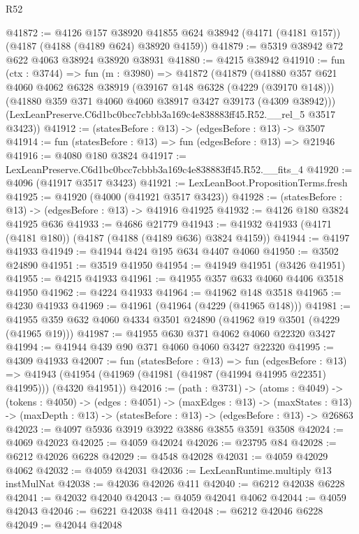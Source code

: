 \begin{lexlean}{R52}
\begin{coremodule}
@41872 := @4126
    @157
    @38920
    @41855
    @624
    @38942
    (@4171 (@4181 @157))
    (@4187 (@4188 (@4189 @624) @38920 @4159))
@41879 := @5319 @38942 @72 @622 @4063 @38924 @38920 @38931
@41880 := @4215 @38942
@41910 := fun (ctx : @3744) =>
  fun (m : @3980) =>
  @41872
    (@41879
      (@41880
        @357
        @621
        @4060
        @4062
        @6328
        @38919
        (@39167 @148 @6328 (@4229 (@39170 @148)))
        (@41880 @359 @371 @4060 @4060 @38917 @3427 @39173 (@4309 @38942)))
      (LexLeanPreserve.C6d1bc0bcc7cbbb3a169c4e838883ff45.R52.__rel_5 @3517 @3423))
@41912 := (statesBefore : @13) -> (edgesBefore : @13) -> @3507
@41914 := fun (statesBefore : @13) => fun (edgesBefore : @13) => @21946
@41916 := @4080 @180 @3824
@41917 := LexLeanPreserve.C6d1bc0bcc7cbbb3a169c4e838883ff45.R52.__fits_4
@41920 := @4096 (@41917 @3517 @3423)
@41921 := LexLeanBoot.PropositionTerms.fresh
@41925 := @41920 (@4000 (@41921 @3517 @3423))
@41928 := (statesBefore : @13) -> (edgesBefore : @13) -> @41916 @41925
@41932 := @4126 @180 @3824 @41925 @636
@41933 := @4686 @21779
@41943 := @41932 @41933 (@4171 (@4181 @180)) (@4187 (@4188 (@4189 @636) @3824 @4159))
@41944 := @4197 @41933
@41949 := @41944 @424 @195 @634 @4407 @4060
@41950 := @3502 @24890
@41951 := @3519 @41950
@41954 := @41949 @41951 (@3426 @41951)
@41955 := @4215 @41933
@41961 := @41955 @357 @633 @4060 @4406 @3518 @41950
@41962 := @4224 @41933
@41964 := @41962 @148 @3518
@41965 := @4230 @41933
@41969 := @41961 (@41964 (@4229 (@41965 @148)))
@41981 := @41955 @359 @632 @4060 @4334 @3501 @24890 (@41962 @19 @3501 (@4229 (@41965 @19)))
@41987 := @41955 @630 @371 @4062 @4060 @22320 @3427
@41994 := @41944 @439 @90 @371 @4060 @4060 @3427 @22320
@41995 := @4309 @41933
@42007 := fun (statesBefore : @13) =>
  fun (edgesBefore : @13) =>
  @41943 (@41954 (@41969 (@41981 (@41987 (@41994 @41995 @22351) @41995))) (@4320 @41951))
@42016 := (path : @3731) ->
  (atoms : @4049) ->
  (tokens : @4050) ->
  (edges : @4051) ->
  (maxEdges : @13) ->
  (maxStates : @13) -> (maxDepth : @13) -> (statesBefore : @13) -> (edgesBefore : @13) -> @26863
@42023 := @4097 @5936 @3919 @3922 @3886 @3855 @3591 @3508
@42024 := @4069 @42023
@42025 := @4059 @42024
@42026 := @23795 @84
@42028 := @6212 @42026 @6228
@42029 := @4548 @42028
@42031 := @4059 @42029 @4062
@42032 := @4059 @42031
@42036 := LexLeanRuntime.multiply @13 instMulNat
@42038 := @42036 @42026 @411
@42040 := @6212 @42038 @6228
@42041 := @42032 @42040
@42043 := @4059 @42041 @4062
@42044 := @4059 @42043
@42046 := @6221 @42038 @411
@42048 := @6212 @42046 @6228
@42049 := @42044 @42048

\end{coremodule}
\end{lexlean}
